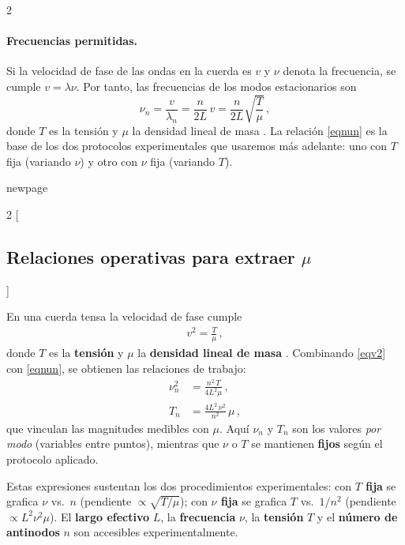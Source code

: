 \begin{multicols}{2}
\paragraph{Frecuencias permitidas.}
Si la velocidad de fase de las ondas en la cuerda es $v$ y $\nu$ denota la frecuencia, se cumple $v=\lambda \nu$. Por tanto, las frecuencias de los modos estacionarios son
\begin{equation}
\nu_n=\frac{v}{\lambda_n}=\frac{n}{2L}\,v
=\frac{n}{2L}\sqrt{\frac{T}{\mu}}\,, \label{eqnun}
\end{equation}
donde $T$ es la tensión y $\mu$ la densidad lineal de masa \parencite{OpenStax16-6,HyperPhysicsString,MIT8.03Lec9}. La relación \eqref{eqnun} es la base de los dos protocolos experimentales que usaremos más adelante: uno con $T$ fija (variando $\nu$) y otro con $\nu$ fija (variando $T$).
\end{multicols}
newpage
\begin{multicols}{2}
[\subsection*{Relaciones operativas para extraer \texorpdfstring{$\mu$}{mu}}]

En una cuerda tensa la velocidad de fase cumple
\begin{align}
    v^{2}=\frac{T}{\mu}\,, \label{eqv2}
\end{align}
donde \(T\) es la \textbf{tensión} y \(\mu\) la \textbf{densidad lineal de masa} \parencite{OpenStax16-6,MIT8.03Lec9}. Combinando \eqref{eqv2} con \eqref{eqnun}, se obtienen las relaciones de trabajo:
\begin{align*}
    \nu_{n}^{2}&=\frac{n^{2}\,T}{4L^{2}\mu}\,,\\
    T_{n}&=\frac{4L^{2}\,\nu^{2}}{n^{2}}\,\mu\,,
\end{align*}
que vinculan las magnitudes medibles con \(\mu\). Aquí \(\nu_{n}\) y \(T_{n}\) son los valores \emph{por modo} (variables entre puntos), mientras que \(\nu\) o \(T\) se mantienen \textbf{fijos} según el protocolo aplicado.

Estas expresiones sustentan los dos procedimientos experimentales: con \textbf{\(T\) fija} se grafica \(\nu\) vs.\ \(n\) (pendiente \(\propto \sqrt{T/\mu}\)); con \textbf{\(\nu\) fija} se grafica \(T\) vs.\ \(1/n^{2}\) (pendiente \(\propto L^{2}\nu^{2}\mu\)). El \textbf{largo efectivo} \(L\), la \textbf{frecuencia} \(\nu\), la \textbf{tensión} \(T\) y el \textbf{número de antinodos} \(n\) son accesibles experimentalmente.
\end{multicols}
